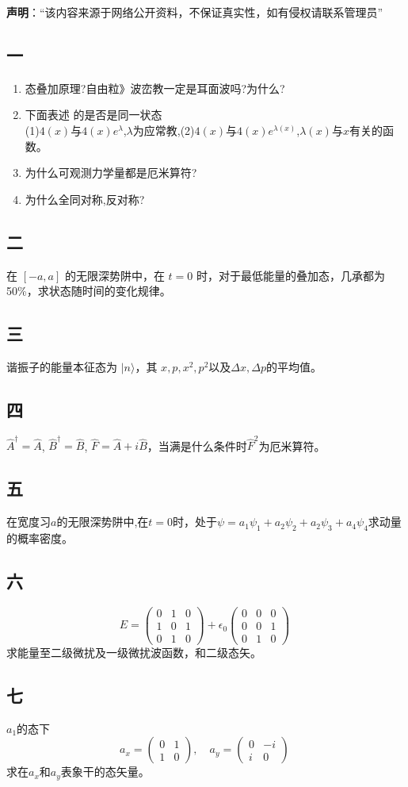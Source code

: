 
\textbf{声明}：“该内容来源于网络公开资料，不保证真实性，如有侵权请联系管理员”

\subsection{一}
\begin{enumerate}
\item 态叠加原理?自由粒》波峦教一定是耳面波吗?为什么?
\item 下面表述 的是否是同一状态\\
(1)$4(x)$与$4(x)e^\lambda$,$\lambda$为应常教,(2)$4(x)$与$4(x)e^{\lambda(x)}$,$\lambda(x)$与$x$有关的函数。
\item 为什么可观测力学量都是厄米算符?
\item 为什么全同对称,反对称?
\end{enumerate}
\subsection{二}
在 $[-a, a]$ 的无限深势阱中，在 $t=0$ 时，对于最低能量的叠加态，几承都为50\%，求状态随时间的变化规律。
\subsection{三}
谐振子的能量本征态为 $\lvert n \rangle$，其 $x,p,x^2,p^2$以及$\Delta x,\Delta p$的平均值。
\subsection{四}
 $\hat{A}^\dagger = \hat{A}$, $\hat{B}^\dagger = \hat{B}$, $\hat{F} = \hat{A} + i\hat{B}$，当满是什么条件时$\hat{F}^2$为厄米算符。
\subsection{五}
在宽度习$a$的无限深势阱中,在$t=0$时，处于$\psi=a_1\psi_1+a_2\psi_2+a_2\psi_3+a_4\psi_4$求动量的概率密度。
\subsection{六}
\[
E = 
\begin{pmatrix}
0 & 1 & 0 \\
1 & 0 & 1 \\
0 & 1 & 0
\end{pmatrix}
+ \epsilon_0 
\begin{pmatrix}
0 & 0 & 0 \\
0 & 0 & 1 \\
0 & 1 & 0
\end{pmatrix}~
\]
求能量至二级微扰及一级微扰波函数，和二级态矢。
\subsection{七}
$a_1$的态下\[
a_x = 
\begin{pmatrix}
0 & 1 \\
1 & 0 
\end{pmatrix}
, \quad 
a_y = 
\begin{pmatrix}
0 & -i \\
i & 0 
\end{pmatrix}~
\]
求在$a_x$和$a_y$表象干的态矢量。
